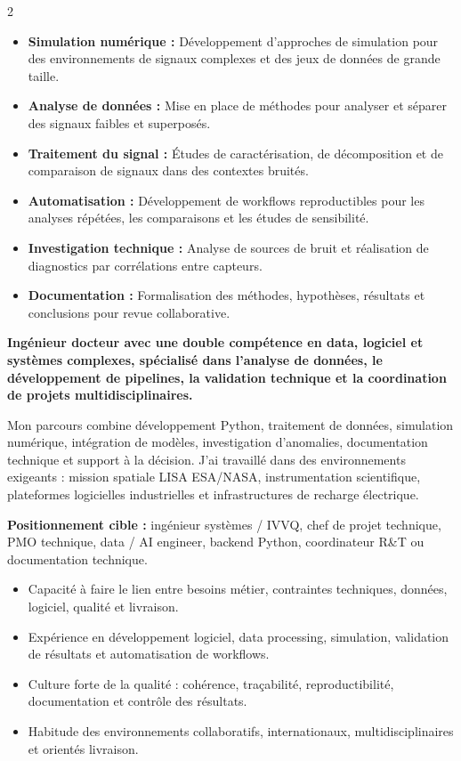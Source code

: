 \documentclass[8pt,a4paper,ragged2e,withhyper]{../_shared/altacv}
\begin{document}
\begin{paracol}{2}
\begin{itemize}
  \item \textbf{Simulation numérique :} Développement d'approches de simulation pour des environnements de signaux complexes et des jeux de données de grande taille.
  \item \textbf{Analyse de données :} Mise en place de méthodes pour analyser et séparer des signaux faibles et superposés.
  \item \textbf{Traitement du signal :} Études de caractérisation, de décomposition et de comparaison de signaux dans des contextes bruités.
  \item \textbf{Automatisation :} Développement de workflows reproductibles pour les analyses répétées, les comparaisons et les études de sensibilité.
  \item \textbf{Investigation technique :} Analyse de sources de bruit et réalisation de diagnostics par corrélations entre capteurs.
  \item \textbf{Documentation :} Formalisation des méthodes, hypothèses, résultats et conclusions pour revue collaborative.
\end{itemize}

\switchcolumn


\textbf{Ingénieur docteur avec une double compétence en data, logiciel et systèmes complexes, spécialisé dans l'analyse de données, le développement de pipelines, la validation technique et la coordination de projets multidisciplinaires.}

Mon parcours combine développement Python, traitement de données, simulation numérique, intégration de modèles, investigation d'anomalies, documentation technique et support à la décision. J'ai travaillé dans des environnements exigeants : mission spatiale LISA ESA/NASA, instrumentation scientifique, plateformes logicielles industrielles et infrastructures de recharge électrique.

\medskip

\textbf{Positionnement cible :} ingénieur systèmes / IVVQ, chef de projet technique, PMO technique, data / AI engineer, backend Python, coordinateur R\&T ou documentation technique.

\begin{itemize}
  \item Capacité à faire le lien entre besoins métier, contraintes techniques, données, logiciel, qualité et livraison.
  \item Expérience en développement logiciel, data processing, simulation, validation de résultats et automatisation de workflows.
  \item Culture forte de la qualité : cohérence, traçabilité, reproductibilité, documentation et contrôle des résultats.
  \item Habitude des environnements collaboratifs, internationaux, multidisciplinaires et orientés livraison.
\end{itemize}


\end{paracol}
\end{document}
